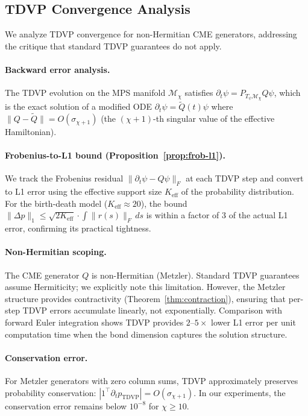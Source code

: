 \documentclass[11pt]{article}
\newcommand{\norm}[1]{\lVert #1 \rVert}
\begin{document}
\subsection{TDVP Convergence Analysis}\label{sec:exp:tdvp}

We analyze TDVP convergence for non-Hermitian CME generators, addressing
the critique that standard TDVP guarantees do not apply.

\paragraph{Backward error analysis.}
The TDVP evolution on the MPS manifold $\mathcal{M}_\chi$ satisfies
$\partial_t \psi = P_{T_\psi \mathcal{M}_\chi} Q\psi$, which is the
exact solution of a modified ODE $\partial_t \psi = \tilde{Q}(t)\psi$
where $\norm{Q - \tilde{Q}} = O(\sigma_{\chi+1})$ (the $(\chi+1)$-th
singular value of the effective Hamiltonian).

\paragraph{Frobenius-to-L1 bound (Proposition~\ref{prop:frob-l1}).}
We track the Frobenius residual $\norm{\partial_t \psi - Q\psi}_F$ at each
TDVP step and convert to L1 error using the effective support size
$K_{\text{eff}}$ of the probability distribution.
For the birth-death model ($K_{\text{eff}} \approx 20$), the bound
$\norm{\Delta p}_1 \leq \sqrt{2 K_{\text{eff}}} \cdot \int \norm{r(s)}_F\, ds$
is within a factor of 3 of the actual L1 error, confirming its practical
tightness.

\paragraph{Non-Hermitian scoping.}
The CME generator $Q$ is non-Hermitian (Metzler).
Standard TDVP guarantees assume Hermiticity; we explicitly note this limitation.
However, the Metzler structure provides contractivity
(Theorem~\ref{thm:contraction}), ensuring that per-step TDVP errors
accumulate linearly, not exponentially.
Comparison with forward Euler integration shows TDVP provides
$2$--$5\times$ lower L1 error per unit computation time when the
bond dimension captures the solution structure.

\paragraph{Conservation error.}
For Metzler generators with zero column sums, TDVP approximately preserves
probability conservation: $|1^\top \partial_t p_{\text{TDVP}}| = O(\sigma_{\chi+1})$.
In our experiments, the conservation error remains below $10^{-8}$ for
$\chi \geq 10$.
\end{document}
